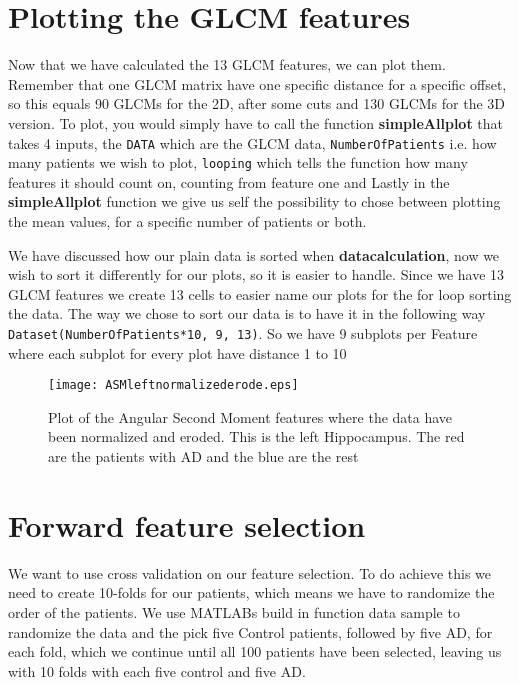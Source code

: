 \section{Plotting the GLCM features}
Now that we have calculated the 13 GLCM features, we can plot them. Remember that one GLCM matrix have one specific distance for a specific offset, so this equals 90 GLCMs for the 2D, after some cuts and 130 GLCMs for the 3D version. To plot, you would simply have to call the function \textbf{simpleAllplot} that takes 4 inputs, the \texttt{DATA} which are the GLCM data, \texttt{NumberOfPatients} i.e. how many patients we wish to plot, \texttt{looping} which tells the function how many features it should count on, counting from feature one and Lastly in the \textbf{simpleAllplot} function we give us self the possibility to chose between plotting the mean values, for a specific number of patients or both.

We have discussed how our plain data is sorted when \textbf{datacalculation}, now we wish to sort it differently for our plots, so it is easier to handle. Since we have 13 GLCM features  we create 13 cells to easier name our plots for the for loop sorting the data. The way we chose to sort our data is to have it in the following way \texttt{Dataset(NumberOfPatients*10, 9, 13)}. So we have 9 subplots per Feature where each subplot for every plot have distance 1 to 10

\begin{figure}[H]
  \centering
  \texttt{[image: ASMleftnormalizederode.eps]}
  \caption{Plot of the Angular Second Moment features where the data have been normalized and eroded. This is the left Hippocampus. The red are the patients with AD and the blue are the rest}\label{fig:ASMNormalizedEroded}
\end{figure}



\section{Forward feature selection}

We want to use cross validation on our feature selection. To do achieve this we need to create 10-folds for our patients, which means we have to randomize the order of the patients. We use MATLABs build in function data sample to randomize the data and the pick five Control patients, followed by five AD, for each fold, which we continue until all 100 patients have been selected, leaving us with 10 folds with each five control and five AD.

